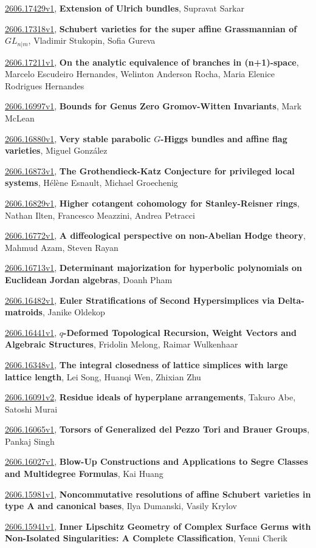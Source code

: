 \documentclass[9pt, a4paper]{article}
\theoremstyle{plain}
\theoremstyle{definition}
\theoremstyle{remark}
\newcommand{\arxiv}[3]{\href{https://arxiv.org/abs/#1}{#1}, \textbf{\textcolor{arxivblue}{#2}}, #3}
\begin{document}
\arxiv{2606.17429v1}{Extension of Ulrich bundles}{Supravat Sarkar}

\arxiv{2606.17318v1}{Schubert varieties for the super affine Grassmannian of $GL_{n|m}$}{Vladimir Stukopin, Sofia Gureva}

\arxiv{2606.17211v1}{On the analytic equivalence of branches in (n+1)-space}{Marcelo Escudeiro Hernandes, Welinton Anderson Rocha, Maria Elenice Rodrigues Hernandes}

\arxiv{2606.16997v1}{Bounds for Genus Zero Gromov-Witten Invariants}{Mark McLean}

\arxiv{2606.16880v1}{Very stable parabolic $G$-Higgs bundles and affine flag varieties}{Miguel González}

\arxiv{2606.16873v1}{The Grothendieck-Katz Conjecture for privileged local systems}{Hélène Esnault, Michael Groechenig}

\arxiv{2606.16829v1}{Higher cotangent cohomology for Stanley-Reisner rings}{Nathan Ilten, Francesco Meazzini, Andrea Petracci}

\arxiv{2606.16772v1}{A diffeological perspective on non-Abelian Hodge theory}{Mahmud Azam, Steven Rayan}

\arxiv{2606.16713v1}{Determinant majorization for hyperbolic polynomials on Euclidean Jordan algebras}{Doanh Pham}

\arxiv{2606.16482v1}{Euler Stratifications of Second Hypersimplices via Delta-matroids}{Janike Oldekop}

\arxiv{2606.16441v1}{$q$-Deformed Topological Recursion, Weight Vectors and Algebraic Structures}{Fridolin Melong, Raimar Wulkenhaar}

\arxiv{2606.16348v1}{The integral closedness of lattice simplices with large lattice length}{Lei Song, Huanqi Wen, Zhixian Zhu}

\arxiv{2606.16091v2}{Residue ideals of hyperplane arrangements}{Takuro Abe, Satoshi Murai}

\arxiv{2606.16065v1}{Torsors of Generalized del Pezzo Tori and Brauer Groups}{Pankaj Singh}

\arxiv{2606.16027v1}{Blow-Up Constructions and Applications to Segre Classes and Multidegree Formulas}{Kai Huang}

\arxiv{2606.15981v1}{Noncommutative resolutions of affine Schubert varieties in type A and canonical bases}{Ilya Dumanski, Vasily Krylov}

\arxiv{2606.15941v1}{Inner Lipschitz Geometry of Complex Surface Germs with Non-Isolated Singularities: A Complete Classification}{Yenni Cherik}
\end{document}
